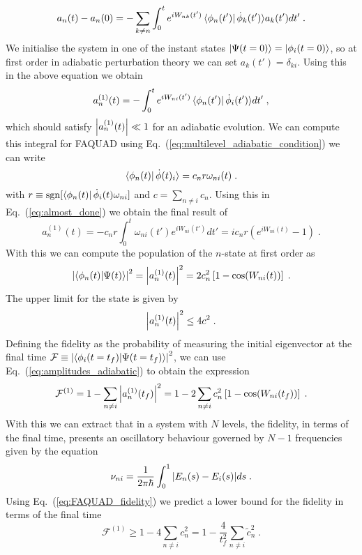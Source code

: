 \begin{equation}
	a_n(t)-a_n(0)=-\sum_{k\neq n}\int_0^te^{iW_{nk}(t')}\bra{\phi_n(t')}\dot{\phi}_k(t')\rangle a_k(t') dt'\; .
\end{equation}
We initialise the system in one of the instant states $\ket{\Psi(t=0)}=\ket{\phi_i(t=0)}$, so at first order in adiabatic perturbation theory we can set $a_k(t')=\delta_{ki}$. Using this in the above equation we obtain
\begin{equation}
	a_n^{(1)}(t)=-\int_0^te^{iW_{ni}(t')}\bra{\phi_n(t')}\dot{\phi}_i(t')\rangle dt'\; ,
	\label{eq:almost_done}
\end{equation}
which should satisfy $\abs{a_n^{(1)}(t)}\ll 1$ for an adiabatic evolution. We can compute this integral for FAQUAD using Eq.~(\ref{eq:multilevel_adiabatic_condition}) we can write
\begin{equation}
	\bra{\phi_n(t)}\dot{\phi}(t)_i\rangle=c_nr\omega_{ni}(t)\; .
\end{equation}
with $r\equiv\operatorname{sgn}[\bra{\phi_n(t)}\dot{\phi}_i(t)\omega_{ni}]$ and $c=\sum_{n\neq i}c_n$. Using this in Eq.~(\ref{eq:almost_done}) we obtain the final result of
\begin{equation}
	a_n^{(1)}(t)=-c_nr\int_0^t\omega_{ni}(t')e^{iW_{ni}(t')}dt'=ic_nr\left(e^{iW_{ni}(t)}-1\right)\; .
\end{equation}
With this we can compute the population of the $n$-state at first order as
\begin{equation}
	\abs{\braket{\phi_n(t)}{\Psi(t)}}^2=\abs{a^{(1)}_n(t)}^2=2c_n^2\left[1-\cos(W_{ni}(t))\right]\; .
	\label{eq:amplitudes_adiabatic}
\end{equation}
The upper limit for the state is given by
\begin{equation}
	\abs{a_n^{(1)}(t)}^2\leq 4c^2\; .
\end{equation}
Defining the fidelity as the probability of measuring the initial eigenvector at the final time $\mathcal{F}\equiv \abs{\braket{\phi_i(t=t_f)}{\Psi(t=t_f)}}^2$, we can use Eq.~(\ref{eq:amplitudes_adiabatic}) to obtain the expression
\begin{equation}
	\mathcal{F}^{(1)}=1-\sum_{n\neq i}\abs{a_n^{(1)}(t_f)}^2=1-2\sum_{n\neq i}c_n^2\left[1-\cos(W_{ni}(t_f))\right]\; .
	\label{eq:FAQUAD_fidelity}
\end{equation}
With this we can extract that in a system with $N$ levels, the fidelity, in terms of the final time, presents an oscillatory behaviour governed by $N-1$ frequencies given by the equation
\begin{equation}
	\nu_{ni}=\frac{1}{2\pi\hbar}\int_0^1\abs{E_n(s)-E_i(s)}ds\; .
	\label{eq:FAQUAD_frecuencies}
\end{equation}
Using Eq.~(\ref{eq:FAQUAD_fidelity}) we predict a lower bound for the fidelity in terms of the final time
\begin{equation}
	\mathcal{F}^{(1)}\geq 1-4\sum_{n\neq i}c_n^2=1-\frac{4}{t_f^2}\sum_{n\neq i}\tilde{c}_n^2\; .
	\label{eq:lower_bound_fidelity}
\end{equation}

